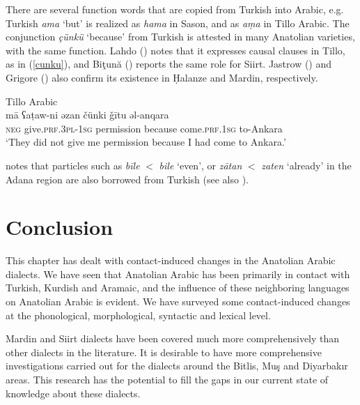 \documentclass[output=paper]{langsci/langscibook}
\begin{document}
There are several function words that are copied from Turkish into Arabic, e.g. Turkish \textit{ama} `but' is realized as \textit{hama} in Sason, and as \textit{a\d{m}a} in Tillo Arabic. The conjunction \textit{\c{c}\"{u}nk\"{u}} `because' from Turkish is attested in many Anatolian varieties, with the same function. Lahdo (\citeyear[179]{Lahdo2009}) notes that it expresses causal clauses in Tillo, as in (\ref{cunku}), and Biţună  (\citeyear[213]{Bituna2016}) reports the same role for Siirt. Jastrow (\citeyear[278]{Jastrow1981}) and Grigore (\citeyear[261]{Grigore2007book}) also confirm its existence in Ḥalanze and Mardin, respectively.

\begin{exe}
\ex Tillo Arabic \citep[179]{Lahdo2009}\\
\label{cunku} \gll m\={a} ʕa\d{t}aw-ni əzan \v{c}\"{u}nki \v{g}\={i}tu əl-anqara\\
\textsc{neg} give.\textsc{prf.3pl}-\textsc{1sg} permission because come.\textsc{prf.1sg} to-Ankara\\
\glt `They did not give me permission because I had come to Ankara.'
\end{exe}
 

\noindent \cite{Procházka2005} notes that particles such as \textit{b\={i}le} $<$ \textit{bile} `even', or \textit{z\={a}tan} $<$ \textit{zaten} `already' in the Adana region are also borrowed from Turkish (see also \citealt{Isaksson2005}). 




\section{Conclusion}

This chapter has dealt with contact-induced changes in the Anatolian Arabic dialects. We have seen that Anatolian Arabic has been primarily in contact with Turkish, Kurdish and Aramaic, and the influence of these neighboring languages on Anatolian Arabic is evident. We have surveyed some contact-induced changes at the phonological, morphological, syntactic and lexical level. %

Mardin and Siirt dialects have been covered much more comprehensively than other dialects in the literature. It is desirable to have more comprehensive investigations carried out for the dialects around the Bitlis, Mu\c{s} and Diyarbak{\i}r areas. This research has the potential to fill the gaps in our current state of knowledge about these dialects. 
\end{document}
